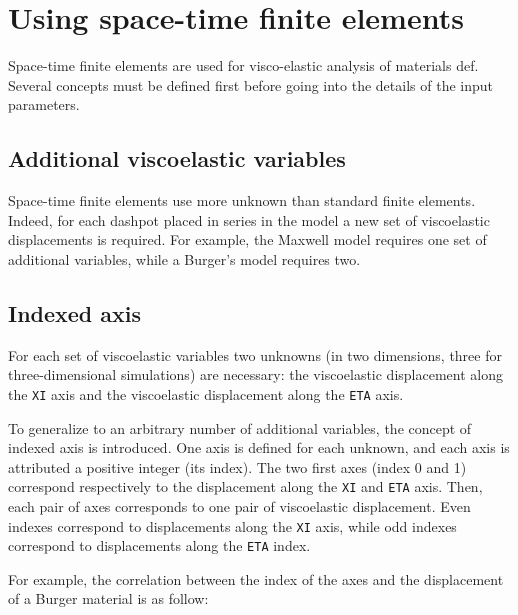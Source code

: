 \documentclass[10pt]{article}
\begin{document}
\section{Using space-time finite elements}

Space-time finite elements are used for visco-elastic analysis of materials def. Several concepts must be defined first before going into the details of the input parameters.

\subsection{Additional viscoelastic variables}

Space-time finite elements use more unknown than standard finite elements. Indeed, for each dashpot placed in series in the model a new set of viscoelastic displacements is required. For example, the Maxwell model requires one set of additional variables, while a Burger's model requires two.

\subsection{Indexed axis}

For each set of viscoelastic variables two unknowns (in two dimensions, three for three-dimensional simulations) are necessary: the viscoelastic displacement along the \verb+XI+ axis and the viscoelastic displacement along the \verb+ETA+ axis.

To generalize to an arbitrary number of additional variables, the concept of indexed axis is introduced. One axis is defined for each unknown, and each axis is attributed a positive integer (its index). The two first axes (index 0 and 1) correspond respectively to the displacement along the \verb+XI+ and \verb+ETA+ axis. Then, each pair of axes corresponds to one pair of viscoelastic displacement. Even indexes correspond to displacements along the \verb+XI+ axis, while odd indexes correspond to displacements along the \verb+ETA+ index.

For example, the correlation between the index of the axes and the displacement of a Burger material is as follow:
\end{document}

